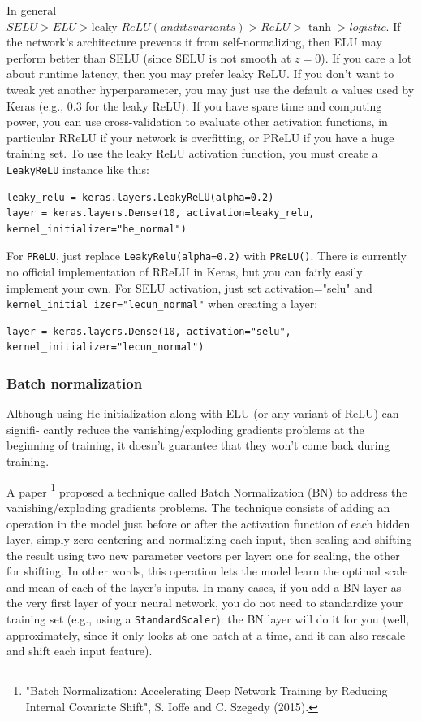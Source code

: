 \documentclass[12pt, letterpaper]{article}
\theoremstyle{definition}
\begin{document}
In general $SELU > ELU > \text{leaky }ReLU (and its variants) > ReLU > \tanh > logistic$. If the network's architecture prevents it from self-normalizing, then ELU may perform better than SELU (since SELU is not smooth at $z = 0$). If you care a lot about runtime latency, then you may prefer leaky ReLU. If you don't want to tweak yet another hyperparameter, you may just use the default $\alpha$ values used by Keras (e.g., $0.3$ for the leaky ReLU). If you have spare time and computing power, you can use cross-validation to evaluate other activation functions, in particular RReLU if your network is overfitting, or PReLU if you have a huge training set.
To use the leaky ReLU activation function, you must create a \lstinline+LeakyReLU+ instance like this:
\begin{lstlisting}
leaky_relu = keras.layers.LeakyReLU(alpha=0.2)
layer = keras.layers.Dense(10, activation=leaky_relu, kernel_initializer="he_normal")
\end{lstlisting}
For \lstinline+PReLU+, just replace \lstinline+LeakyRelu(alpha=0.2)+ with \lstinline+PReLU()+.
There is currently no official implementation of RReLU in Keras, but you can fairly easily implement your own. For SELU activation, just set activation="selu" and \lstinline+kernel_initial izer="lecun_normal"+ when creating a layer:
\begin{lstlisting}
layer = keras.layers.Dense(10, activation="selu", kernel_initializer="lecun_normal")
\end{lstlisting}

\subsubsection{Batch normalization}
Although using He initialization along with ELU (or any variant of ReLU) can signifi‐ cantly reduce the vanishing/exploding gradients problems at the beginning of training, it doesn’t guarantee that they won't come back during training.

A paper \footnote{"Batch Normalization: Accelerating Deep Network Training by Reducing Internal Covariate Shift", S. Ioffe and C. Szegedy (2015).} proposed a technique called Batch Normalization (BN) to address the vanishing/exploding gradients problems. The technique consists of adding an operation in the model just before or after the activation function of each hidden layer, simply zero-centering and normalizing each input, then scaling and shifting the result using two new parameter vectors per layer: one for scaling, the other for shifting. In other words, this operation lets the model learn the optimal scale and mean of each of the layer's inputs. In many cases, if you add a BN layer as the very first layer of your neural network, you do not need to standardize your training set (e.g., using a \lstinline+StandardScaler+): the BN layer will do it for you (well, approximately, since it only looks at one batch at a time, and it can also rescale and shift each input feature).
\end{document}
